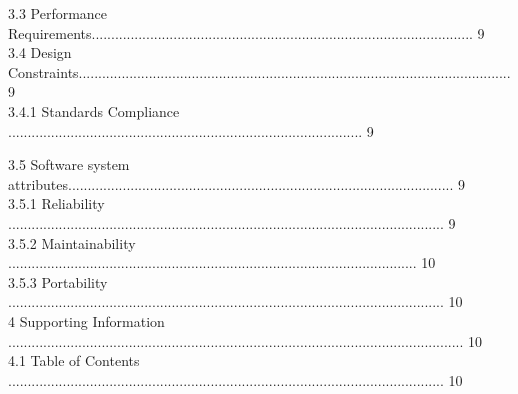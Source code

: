 \documentclass[10pt,draftclsnofoot,onecolumn]{IEEEtran}
\newcommand\tab[1][1cm]{\hspace*{#1}}
\begin{document}
\tab 3.3 Performance Requirements.................................................................................................. 9\\
                 \vspace{5mm}
\tab 3.4 Design Constraints............................................................................................................... 9\\
                 \vspace{5mm}
\tab \tab 3.4.1 Standards Compliance ........................................................................................... 9\\
                 \vspace{5mm}
                 
\tab 3.5 Software system attributes................................................................................................... 9\\
  \vspace{5mm}
\tab \tab 3.5.1 Reliability ................................................................................................................ 9\\
                 \vspace{5mm}
\tab \tab 3.5.2 Maintainability ......................................................................................................... 10\\
                 \vspace{5mm}
\tab \tab 3.5.3 Portability ................................................................................................................ 10\\
                 \vspace{5mm}
4 Supporting Information ..................................................................................................................... 10\\
                 \vspace{5mm}
\tab 4.1 Table of Contents ................................................................................................................ 10\\
                 \vspace{5mm}
\end{document}
